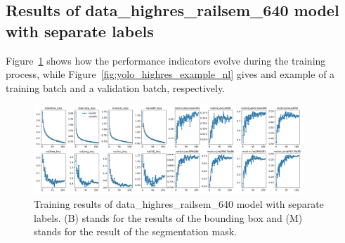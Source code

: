 \documentclass[Master,MDS,english]{BASE/twbook} %
\begin{document}

\subsection{Results of data\_highres\_railsem\_640 model with separate labels}

Figure~\ref{fig:training_highres_nl} shows how the performance indicators evolve during the training process, while Figure~\ref{fig:yolo_highres_example_nl} gives and example of a training batch and a validation batch, respectively.


\begin{figure}[h]
\centering
\includegraphics[width=0.9\textwidth]{images/yolo/highres/results}
\caption{Training results of data\_highres\_railsem\_640 model with separate labels. (B) stands for the results of the bounding box and (M) stands for the result of the segmentation mask.}
\label{fig:training_highres_nl}
\end{figure}
\end{document}
